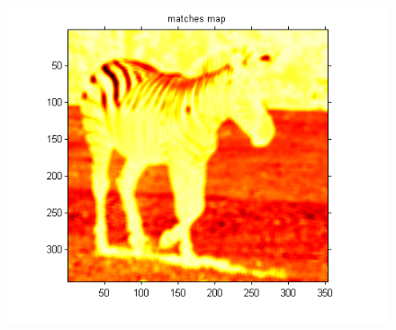 \documentclass[compress]{beamer} %
\begin{document}
\begin{frame}
\begin{figure}
\begin{minipage}{0.3\linewidth}
\end{minipage}
\begin{minipage}{0.3\linewidth}
\includegraphics[width=1.3\linewidth]{zebra_heatmap_approx.png}
\end{minipage}
\end{figure}
\end{frame}
\end{document}
